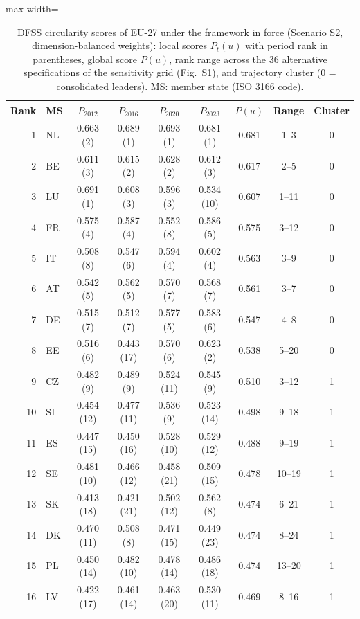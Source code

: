 \begin{table}[pos=t]\centering\footnotesize
\caption{DFSS circularity scores of EU-27 under the framework in force (Scenario S2, dimension-balanced weights): local scores $P_t(u)$ with period rank in parentheses, global score $P(u)$, rank range across the 36 alternative specifications of the sensitivity grid (Fig.~S1), and trajectory cluster (0 = consolidated leaders). MS: member state (ISO 3166 code).}
\label{tab:dfss}
\begin{adjustbox}{max width=\linewidth}\begin{tabular}{@{}rlccccccc@{}}\toprule
Rank & MS & $P_{2012}$ & $P_{2016}$ & $P_{2020}$ & $P_{2023}$ & $P(u)$ & Range & Cluster \\ \midrule
1 & NL & 0.663 (2) & 0.689 (1) & 0.693 (1) & 0.681 (1) & 0.681 & 1--3 & 0 \\
2 & BE & 0.611 (3) & 0.615 (2) & 0.628 (2) & 0.612 (3) & 0.617 & 2--5 & 0 \\
3 & LU & 0.691 (1) & 0.608 (3) & 0.596 (3) & 0.534 (10) & 0.607 & 1--11 & 0 \\
4 & FR & 0.575 (4) & 0.587 (4) & 0.552 (8) & 0.586 (5) & 0.575 & 3--12 & 0 \\
5 & IT & 0.508 (8) & 0.547 (6) & 0.594 (4) & 0.602 (4) & 0.563 & 3--9 & 0 \\
6 & AT & 0.542 (5) & 0.562 (5) & 0.570 (7) & 0.568 (7) & 0.561 & 3--7 & 0 \\
7 & DE & 0.515 (7) & 0.512 (7) & 0.577 (5) & 0.583 (6) & 0.547 & 4--8 & 0 \\
8 & EE & 0.516 (6) & 0.443 (17) & 0.570 (6) & 0.623 (2) & 0.538 & 5--20 & 0 \\
9 & CZ & 0.482 (9) & 0.489 (9) & 0.524 (11) & 0.545 (9) & 0.510 & 3--12 & 1 \\
10 & SI & 0.454 (12) & 0.477 (11) & 0.536 (9) & 0.523 (14) & 0.498 & 9--18 & 1 \\
11 & ES & 0.447 (15) & 0.450 (16) & 0.528 (10) & 0.529 (12) & 0.488 & 9--19 & 1 \\
12 & SE & 0.481 (10) & 0.466 (12) & 0.458 (21) & 0.509 (15) & 0.478 & 10--19 & 1 \\
13 & SK & 0.413 (18) & 0.421 (21) & 0.502 (12) & 0.562 (8) & 0.474 & 6--21 & 1 \\
14 & DK & 0.470 (11) & 0.508 (8) & 0.471 (15) & 0.449 (23) & 0.474 & 8--24 & 1 \\
15 & PL & 0.450 (14) & 0.482 (10) & 0.478 (14) & 0.486 (18) & 0.474 & 13--20 & 1 \\
16 & LV & 0.422 (17) & 0.461 (14) & 0.463 (20) & 0.530 (11) & 0.469 & 8--16 & 1 \\

\end{tabular}
\end{adjustbox}
\end{table}
